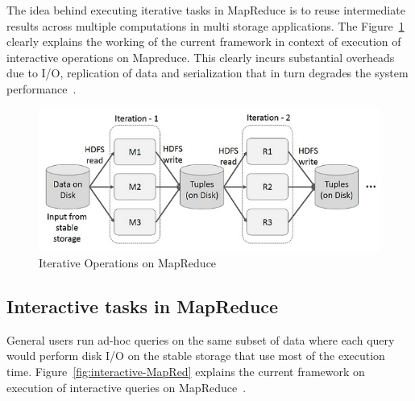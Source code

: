 The idea behind executing iterative tasks in MapReduce is to reuse intermediate 
results across multiple computations in multi storage applications. 
The Figure~\ref{fig:iterative-MapRed} clearly explains the working of the  
current framework in context of execution of interactive operations on 
Mapreduce. This clearly incurs substantial overheads due to I/O, replication of 
data and serialization that in turn degrades the system performance~\cite{hid-sp18-410-spark-RDD}. 



\begin{figure}[!ht]
  \centering\includegraphics[width=\columnwidth]{images/iterative-MapReduce.png}
   \caption{Iterative Operations on MapReduce 
   ~\cite{hid-sp18-410-spark-RDD}}\label{fig:iterative-MapRed}
\end{figure}









\subsection{Interactive tasks in MapReduce}

General users run ad-hoc queries on the same subset of data where each query 
would perform disk I/O on the stable storage that use most of the execution time.
Figure~\ref{fig:interactive-MapRed} explains the current framework on execution 
of interactive queries on MapReduce~\cite{hid-sp18-410-spark-RDD}.

